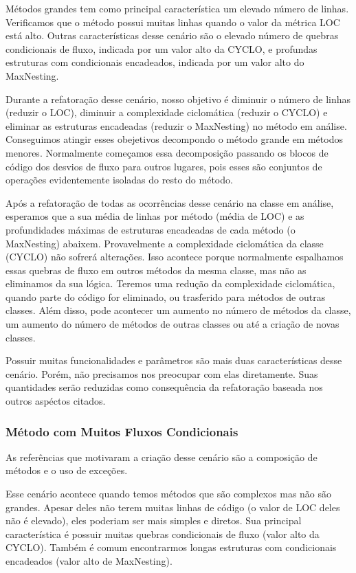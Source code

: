	Métodos grandes tem como principal característica um elevado número de linhas. Verificamos que o método possui muitas linhas quando o valor da métrica LOC está alto. Outras características desse cenário são o elevado número de quebras condicionais de fluxo, indicada por um valor alto da CYCLO, e profundas estruturas com condicionais encadeados, indicada por um valor alto do MaxNesting. 
	
	Durante a refatoração desse cenário, nosso objetivo é diminuir o número de linhas (reduzir o LOC), diminuir a complexidade ciclomática (reduzir o CYCLO) e eliminar as estruturas encadeadas (reduzir o MaxNesting) no método em análise. Conseguimos atingir esses obejetivos decompondo o método grande em métodos menores. Normalmente começamos essa decomposição passando os blocos de código dos desvios de fluxo para outros lugares, pois esses são conjuntos de operações evidentemente isoladas do resto do método.
	
	Após a refatoração de todas as ocorrências desse cenário na classe em análise, esperamos que a sua média de linhas por método (média de LOC) e as profundidades máximas de estruturas encadeadas de cada método (o MaxNesting) abaixem. Provavelmente a complexidade ciclomática da classe (CYCLO) não sofrerá alterações. Isso acontece porque normalmente espalhamos essas quebras de fluxo em outros métodos da mesma classe, mas não as eliminamos da sua lógica. Teremos uma redução da complexidade ciclomática, quando parte do código for eliminado, ou trasferido para métodos de outras classes. Além disso, pode acontecer um aumento no número de métodos da classe, um aumento do número de métodos de outras classes ou até a criação de novas classes.
	
	Possuir muitas funcionalidades e parâmetros são mais duas características desse cenário. Porém, não precisamos nos preocupar com elas diretamente. Suas quantidades serão reduzidas como consequência da refatoração baseada nos outros aspéctos citados.
	
	
	
\subsubsection{Método com Muitos Fluxos Condicionais}

	As referências que motivaram a criação desse cenário são a composição de métodos e o uso de exceções.
	
	Esse cenário acontece quando temos métodos que são complexos mas não são grandes. Apesar deles não terem muitas linhas de código (o valor de LOC deles não é elevado), eles poderiam ser mais simples e diretos. Sua principal característica é possuir muitas quebras condicionais de fluxo (valor alto da CYCLO). Também é comum encontrarmos longas estruturas com condicionais encadeados (valor alto de MaxNesting).
	
